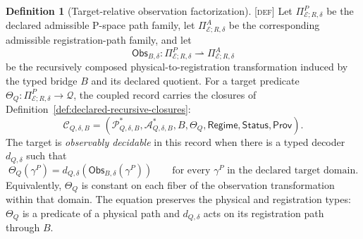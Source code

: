 \documentclass[11pt]{article}
\newcommand{\ObsMap}{\ensuremath{\mathsf{Obs}}}
\newcommand{\Defn}{\textsc{[def]}}
\theoremstyle{definition}
\newtheorem{sdefinition}{Definition}
\begin{document}
\begin{sdefinition}[Target-relative observation factorization]
\label{def:target-relative-observation-factorization}
\Defn{} Let $\Pi^P_{\mathcal E;R,\delta}$ be the declared admissible P-space path
family, let $\Pi^A_{\mathcal E;R,\delta}$ be the corresponding admissible
registration-path family, and let
\begin{equation}
\ObsMap_{B,\delta}:\Pi^P_{\mathcal E;R,\delta}\rightharpoonup
\Pi^A_{\mathcal E;R,\delta}
\label{eq:observation-transformation}
\end{equation}
be the recursively composed physical-to-registration transformation induced by the
typed bridge $B$ and its declared quotient. For a target predicate
$\Theta_Q:\Pi^P_{\mathcal E;R,\delta}\to\mathcal Q$, the coupled record carries the closures of
Definition~\ref{def:declared-recursive-closures}:
\begin{equation}
\mathcal C_{Q,\delta,B}=
\left(
\mathcal P^{\ast}_{Q,\delta,B},\mathcal A^{\ast}_{Q,\delta,B},B,
\Theta_Q,\mathsf{Regime},\mathsf{Status},\mathsf{Prov}
\right).
\label{eq:coupled-observation-record}
\end{equation}
The target is \emph{observably decidable} in this record when there is a typed
decoder $d_{Q,\delta}$ such that
\begin{equation}
\Theta_Q(\gamma^P)=
d_{Q,\delta}\!\left(\ObsMap_{B,\delta}(\gamma^P)\right)
\qquad
\text{for every }\gamma^P\text{ in the declared target domain.}
\label{eq:target-observation-factorization}
\end{equation}
Equivalently, $\Theta_Q$ is constant on each fiber of the observation
transformation within that domain. The equation preserves the physical and
registration types: $\Theta_Q$ is a predicate of a physical path and
$d_{Q,\delta}$ acts on its registration path through $B$.
\end{sdefinition}
\end{document}
